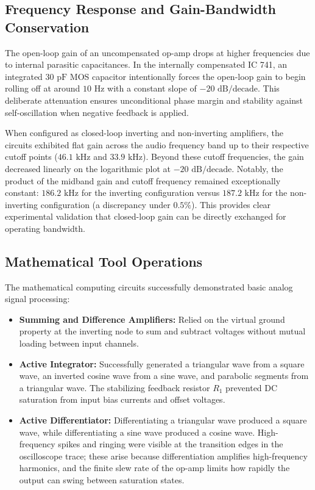 \documentclass[12pt,a4paper]{article}
\begin{document}
\subsection{Frequency Response and Gain-Bandwidth Conservation}
The open-loop gain of an uncompensated op-amp drops at higher frequencies due to internal parasitic capacitances. In the internally compensated IC 741, an integrated $30\text{ pF}$ MOS capacitor intentionally forces the open-loop gain to begin rolling off at around $10\text{ Hz}$ with a constant slope of $-20\text{ dB/decade}$. This deliberate attenuation ensures unconditional phase margin and stability against self-oscillation when negative feedback is applied.

When configured as closed-loop inverting and non-inverting amplifiers, the circuits exhibited flat gain across the audio frequency band up to their respective cutoff points ($46.1\text{ kHz}$ and $33.9\text{ kHz}$). Beyond these cutoff frequencies, the gain decreased linearly on the logarithmic plot at $-20\text{ dB/decade}$. Notably, the product of the midband gain and cutoff frequency remained exceptionally constant: $186.2\text{ kHz}$ for the inverting configuration versus $187.2\text{ kHz}$ for the non-inverting configuration (a discrepancy under $0.5\%$). This provides clear experimental validation that closed-loop gain can be directly exchanged for operating bandwidth.

\subsection{Mathematical Tool Operations}
The mathematical computing circuits successfully demonstrated basic analog signal processing:
\begin{itemize}
    \item \textbf{Summing and Difference Amplifiers:} Relied on the virtual ground property at the inverting node to sum and subtract voltages without mutual loading between input channels.
    \item \textbf{Active Integrator:} Successfully generated a triangular wave from a square wave, an inverted cosine wave from a sine wave, and parabolic segments from a triangular wave. The stabilizing feedback resistor $R_1$ prevented DC saturation from input bias currents and offset voltages.
    \item \textbf{Active Differentiator:} Differentiating a triangular wave produced a square wave, while differentiating a sine wave produced a cosine wave. High-frequency spikes and ringing were visible at the transition edges in the oscilloscope trace; these arise because differentiation amplifies high-frequency harmonics, and the finite slew rate of the op-amp limits how rapidly the output can swing between saturation states.
\end{itemize}
\end{document}
